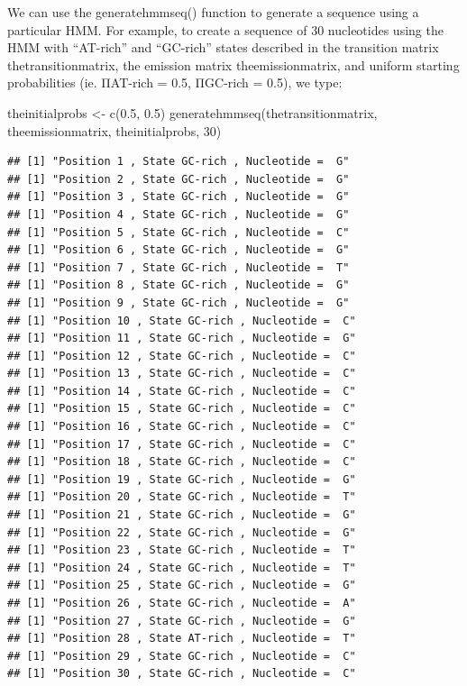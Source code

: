 \documentclass[
]{book}
\newenvironment{Shaded}{\begin{snugshade}}{\end{snugshade}}
\newcommand{\DecValTok}[1]{\textcolor[rgb]{0.00,0.00,0.81}{#1}}
\newcommand{\FloatTok}[1]{\textcolor[rgb]{0.00,0.00,0.81}{#1}}
\newcommand{\FunctionTok}[1]{\textcolor[rgb]{0.00,0.00,0.00}{#1}}
\newcommand{\NormalTok}[1]{#1}
\newcommand{\OtherTok}[1]{\textcolor[rgb]{0.56,0.35,0.01}{#1}}
\begin{document}
We can use the generatehmmseq() function to generate a sequence using a particular HMM. For example, to create a sequence of 30 nucleotides using the HMM with ``AT-rich'' and ``GC-rich'' states described in the transition matrix thetransitionmatrix, the emission matrix theemissionmatrix, and uniform starting probabilities (ie. ΠAT-rich = 0.5, ΠGC-rich = 0.5), we type:

\begin{Shaded}
\begin{Highlighting}[]
\NormalTok{theinitialprobs }\OtherTok{\textless{}{-}} \FunctionTok{c}\NormalTok{(}\FloatTok{0.5}\NormalTok{, }\FloatTok{0.5}\NormalTok{)}
\FunctionTok{generatehmmseq}\NormalTok{(thetransitionmatrix, theemissionmatrix, theinitialprobs, }\DecValTok{30}\NormalTok{)}
\end{Highlighting}
\end{Shaded}

\begin{verbatim}
## [1] "Position 1 , State GC-rich , Nucleotide =  G"
## [1] "Position 2 , State GC-rich , Nucleotide =  G"
## [1] "Position 3 , State GC-rich , Nucleotide =  G"
## [1] "Position 4 , State GC-rich , Nucleotide =  G"
## [1] "Position 5 , State GC-rich , Nucleotide =  C"
## [1] "Position 6 , State GC-rich , Nucleotide =  G"
## [1] "Position 7 , State GC-rich , Nucleotide =  T"
## [1] "Position 8 , State GC-rich , Nucleotide =  G"
## [1] "Position 9 , State GC-rich , Nucleotide =  G"
## [1] "Position 10 , State GC-rich , Nucleotide =  C"
## [1] "Position 11 , State GC-rich , Nucleotide =  G"
## [1] "Position 12 , State GC-rich , Nucleotide =  C"
## [1] "Position 13 , State GC-rich , Nucleotide =  C"
## [1] "Position 14 , State GC-rich , Nucleotide =  C"
## [1] "Position 15 , State GC-rich , Nucleotide =  C"
## [1] "Position 16 , State GC-rich , Nucleotide =  C"
## [1] "Position 17 , State GC-rich , Nucleotide =  C"
## [1] "Position 18 , State GC-rich , Nucleotide =  C"
## [1] "Position 19 , State GC-rich , Nucleotide =  G"
## [1] "Position 20 , State GC-rich , Nucleotide =  T"
## [1] "Position 21 , State GC-rich , Nucleotide =  G"
## [1] "Position 22 , State GC-rich , Nucleotide =  G"
## [1] "Position 23 , State GC-rich , Nucleotide =  T"
## [1] "Position 24 , State GC-rich , Nucleotide =  T"
## [1] "Position 25 , State GC-rich , Nucleotide =  G"
## [1] "Position 26 , State GC-rich , Nucleotide =  A"
## [1] "Position 27 , State GC-rich , Nucleotide =  G"
## [1] "Position 28 , State AT-rich , Nucleotide =  T"
## [1] "Position 29 , State GC-rich , Nucleotide =  C"
## [1] "Position 30 , State GC-rich , Nucleotide =  C"
\end{verbatim}
\end{document}
